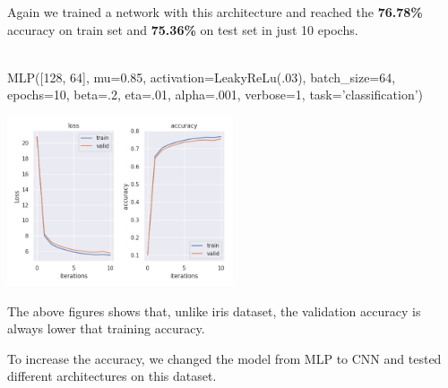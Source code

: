 \documentclass[10pt]{SelfArx} %
\begin{document}
Again we trained a network with this architecture and reached the \textbf{76.78\%} accuracy on train set and \textbf{75.36\%} on test set in just 10 epochs.
\\
\\
\begin{python}
MLP([128, 64], mu=0.85,
activation=LeakyReLu(.03),
batch_size=64, epochs=10, 
beta=.2, eta=.01, alpha=.001,
verbose=1, task='classification')
\end{python}
\begin{center}
	\includegraphics[width=\linewidth,height=5cm]{img/fashion-plots2}
	\label{ffashion2}
\end{center}
The above figures shows that, unlike iris dataset, the validation accuracy is always lower that training accuracy. 

To increase the accuracy, we changed the model from MLP to CNN and tested different architectures on this dataset.\\
\end{document}
